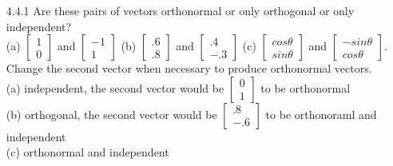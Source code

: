 \documentclass[10pt,twoside,reqno]{article}
\begin{document}
\begin{enumerate}
\item[4.4.1] Are these pairs of vectors orthonormal or only orthogonal or only independent?\\
\vspace{2mm}
(a) $\left[\begin{smallmatrix} 1\\ 0 \end{smallmatrix} \right]$ and $\left[\begin{smallmatrix} -1\\ 1 \end{smallmatrix} \right]$ \hspace{3mm} (b) $\left[\begin{smallmatrix} .6\\ .8 \end{smallmatrix} \right]$ and $\left[\begin{smallmatrix} .4\\ -.3 \end{smallmatrix} \right]$ \hspace{3mm} (c) $\left[\begin{smallmatrix} cos\theta\\ sin\theta \end{smallmatrix} \right]$ and $\left[\begin{smallmatrix} -sin\theta\\ cos\theta \end{smallmatrix} \right]$.\\
\vspace{2mm}
Change the second vector when necessary to produce orthonormal vectors.\\
\vspace{3mm}
(a) independent, the second vector would be $\left[\begin{smallmatrix} 0\\ 1 \end{smallmatrix} \right]$ to be orthonormal\\
\vspace{3mm}
(b) orthogonal, the second vector would be $\left[\begin{smallmatrix} .8\\ -.6\end{smallmatrix} \right]$ to be orthonoraml and independent\\
\vspace{3mm}
(c) orthonormal and independent\\
\vspace{3mm}


\end{enumerate}
\end{document}
